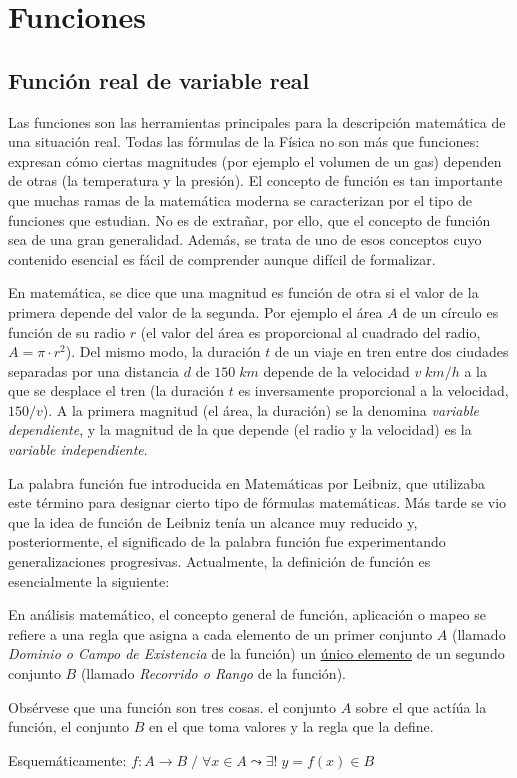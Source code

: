 \chapter{Funciones}	

	\section{Función real de variable real}
	
		
Las funciones son las herramientas principales para la descripción matemática de una situación real. Todas las fórmulas de la Fí­sica no son más que funciones: expresan cómo ciertas magnitudes (por ejemplo el volumen de un gas) dependen de otras (la temperatura y la presión). El concepto de función es tan importante que muchas ramas de la matemática moderna se caracterizan por el tipo de funciones que estudian. No es de extrañar, por ello, que el concepto de función sea de una gran generalidad. Además, se trata de uno de esos conceptos cuyo contenido esencial es fácil de comprender aunque difí­cil de formalizar.

	En matemática, se dice que una magnitud es función de otra si el valor de la primera depende del valor de la segunda. Por ejemplo el área $A$ de un cí­rculo es función de su radio $r$ (el valor del área es proporcional al cuadrado del radio, $A = \pi\cdot r^2$). Del mismo modo, la duración $t$ de un viaje en tren entre dos ciudades separadas por una distancia $d$ de $150\;  km$ depende de la velocidad $v \; km/h$ a la que se desplace el tren (la duración $t$ es inversamente proporcional a la velocidad, $150 / v$). A la primera magnitud (el área, la duración) se la denomina \emph{variable dependiente}, y la magnitud de la que depende (el radio y la velocidad) es la \emph{variable independiente}.

	La palabra función fue introducida en Matemáticas por Leibniz, que utilizaba este término para designar cierto tipo de fórmulas matemáticas. Más tarde se vio que la idea de función de Leibniz tení­a un alcance muy reducido y, posteriormente, el significado de la palabra función fue experimentando generalizaciones progresivas. Actualmente, la definición de función es esencialmente la siguiente:
	
	\begin{defi}
		En análisis matemático, el concepto general de función, aplicación o mapeo se refiere a una regla que asigna a cada elemento de un primer conjunto $A$ (llamado \emph{Dominio o Campo de Existencia} de la función) un \underline{único elemento} de un segundo conjunto $B$ (llamado \emph{Recorrido o Rango} de la función).
		
		 Obsérvese que una función son tres cosas. el conjunto $A$ sobre el que actíúa la función, el conjunto $B$ en el que toma valores y la regla que la define. 
	
		 Esquemáticamente: $f: A \to B \; / \; \forall x \in A \leadsto \exists ! \; y=f(x) \in B$
		
	\end{defi}
	
